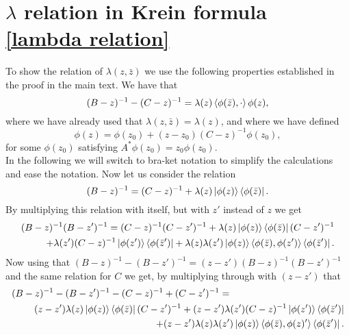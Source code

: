 \documentclass[a4paper,11pt]{article}
\numberwithin{equation}{section}
\begin{document}
\appendix
\section{$ \lambda $ relation in Krein formula \eqref{lambda relation}}
\label{Lambda calculation}
To show the relation of $ \lambda(z,\bar{z}) $ we use the following properties established in the proof in the main text. We have that \begin{equation}\label{Krein relation 1}
(B-z)^{-1}-(C-z)^{-1}=\lambda(z)\braket{\phi(\bar{z}),\cdot}\phi(z),
\end{equation}
where we have already used that $ \lambda(z,\bar{z})=\lambda(z) $, and where we have defined \begin{equation}\label{Krein relation 2}
\phi(z)=\phi(z_0)+(z-z_0)(C-z)^{-1}\phi(z_0),
\end{equation}
for some $ \phi(z_0) $ satisfying $ A^*\phi(z_0)=z_0\phi(z_0) $. \\
In the following we will switch to bra-ket notation to simplify the calculations and ease the notation. Now let us consider the relation \begin{equation}
(B-z)^{-1}=(C-z)^{-1}+\lambda(z)\ket{\phi(z)}\bra{\phi(\bar{z})}.
\end{equation}
By multiplying this relation with itself, but with $ z' $ instead of $ z $ we get\begin{equation}
\begin{aligned}
(B-z)^{-1}(B-z')^{-1}=(C-z)^{-1}(C-z')^{-1}+\lambda(z)\ket{\phi(z)}\bra{\phi(\bar{z})}(C-z')^{-1}\\+\lambda(z')(C-z)^{-1}\ket{\phi(z')}\bra{\phi(\bar{z}')}+\lambda(z)\lambda(z')\ket{\phi(z)}\braket{\phi(\bar{z}),\phi(z')}\bra{\phi(\bar{z}')}.
\end{aligned}
\end{equation}
Now using that $ (B-z)^{-1}-(B-z')^{-1}=(z-z')(B-z)^{-1}(B-z')^{-1} $ and the same relation for $ C $ we get, by multiplying through with $ (z-z') $ that \begin{equation}
\begin{aligned}
(B-z)^{-1}-(B-z')^{-1}-(C-z)^{-1}+(C-z')^{-1}=\qquad\qquad\qquad\qquad\qquad\qquad\\(z-z')\lambda(z)\ket{\phi(z)}\bra{\phi(\bar{z})}(C-z')^{-1}+(z-z')\lambda(z')(C-z)^{-1}\ket{\phi(z')}\bra{\phi(\bar{z}')}\\+(z-z')\lambda(z)\lambda(z')\ket{\phi(z)}\braket{\phi(\bar{z}),\phi(z)'}\bra{\phi(\bar{z}')}.
\end{aligned}
\end{equation}
\end{document}
